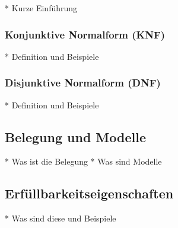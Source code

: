 * Kurze Einführung

\subsubsection{Konjunktive Normalform (KNF)}

* Definition und Beispiele

\subsubsection{Disjunktive Normalform (DNF)}

* Definition und Beispiele

\subsection{Belegung und Modelle}

* Was ist die Belegung
* Was sind Modelle

\subsection{Erfüllbarkeitseigenschaften}

* Was sind diese und Beispiele
